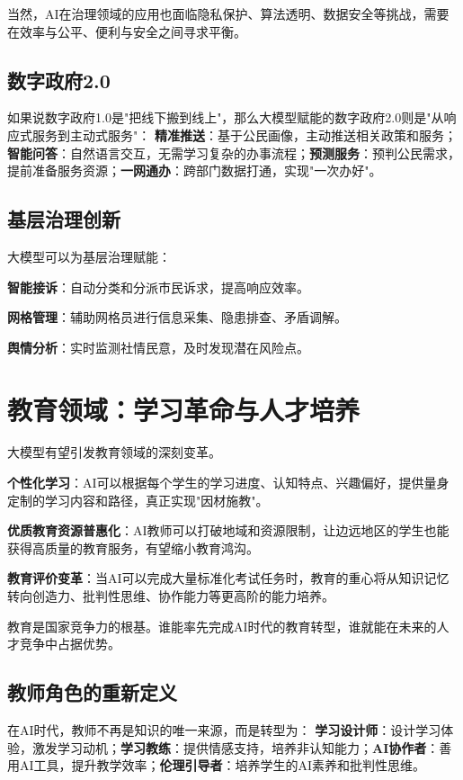当然，AI在治理领域的应用也面临隐私保护、算法透明、数据安全等挑战，需要在效率与公平、便利与安全之间寻求平衡。

\subsection{数字政府2.0}

如果说数字政府1.0是"把线下搬到线上"，那么大模型赋能的数字政府2.0则是"从响应式服务到主动式服务"：
\textbf{精准推送}：基于公民画像，主动推送相关政策和服务；\textbf{智能问答}：自然语言交互，无需学习复杂的办事流程；\textbf{预测服务}：预判公民需求，提前准备服务资源；\textbf{一网通办}：跨部门数据打通，实现"一次办好"。

\subsection{基层治理创新}

大模型可以为基层治理赋能：

\textbf{智能接诉}：自动分类和分派市民诉求，提高响应效率。

\textbf{网格管理}：辅助网格员进行信息采集、隐患排查、矛盾调解。

\textbf{舆情分析}：实时监测社情民意，及时发现潜在风险点。

\section{教育领域：学习革命与人才培养}

大模型有望引发教育领域的深刻变革。

\textbf{个性化学习}：AI可以根据每个学生的学习进度、认知特点、兴趣偏好，提供量身定制的学习内容和路径，真正实现"因材施教"。

\textbf{优质教育资源普惠化}：AI教师可以打破地域和资源限制，让边远地区的学生也能获得高质量的教育服务，有望缩小教育鸿沟。

\textbf{教育评价变革}：当AI可以完成大量标准化考试任务时，教育的重心将从知识记忆转向创造力、批判性思维、协作能力等更高阶的能力培养。

教育是国家竞争力的根基。谁能率先完成AI时代的教育转型，谁就能在未来的人才竞争中占据优势。

\subsection{教师角色的重新定义}

在AI时代，教师不再是知识的唯一来源，而是转型为：
\textbf{学习设计师}：设计学习体验，激发学习动机；\textbf{学习教练}：提供情感支持，培养非认知能力；\textbf{AI协作者}：善用AI工具，提升教学效率；\textbf{伦理引导者}：培养学生的AI素养和批判性思维。


